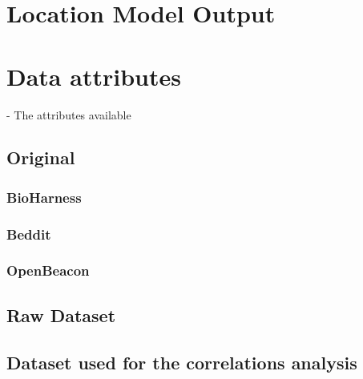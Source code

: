 \lstset{
	numberstyle=\tiny,
	frame=tb,
	basicstyle=\small,
	tabsize=1,
}

\begin{appendices}
	\section{Location Model Output}
		

	\section{Data attributes}
		- The attributes available
		\subsection{Original}
			\subsubsection{BioHarness}
			\subsubsection{Beddit}
			\subsubsection{OpenBeacon}
		\subsection{Raw Dataset}
			
		\subsection{Dataset used for the correlations analysis}

			
		
\end{appendices}
